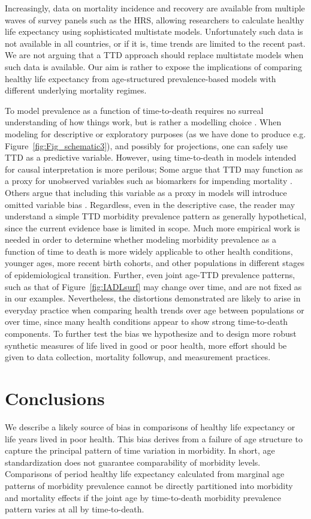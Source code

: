 \documentclass[11pt,oneside,a4paper]{article} %
\begin{document}
Increasingly, data on mortality incidence and recovery are available from
multiple waves of survey panels such as the HRS, allowing researchers to
calculate healthy life expectancy using sophisticated multistate models.
Unfortunately such data is not available in all countries, or if it is, time
trends are limited to the recent past. We are not arguing that a TTD approach
should replace multistate models when such data is available. Our aim is rather
to expose the implications of comparing healthy life expectancy from
age-structured prevalence-based models with different underlying mortality
regimes.

To model prevalence as a function of
time-to-death requires no surreal understanding of how things work, but is
rather a modelling choice \citep{wolf2015disability}. When modeling for
descriptive or exploratory purposes (as we have done to produce e.g. Figure~\ref{fig:Fig_schematic3}),
and possibly for projections, one can safely use
TTD as a predictive variable.
However, using time-to-death in models intended for causal interpretation is more perilous; Some argue that TTD may function as a proxy for unobserved variables such as biomarkers for impending mortality \citep{wolf2015disability}. Others argue that including this variable as a proxy in models will introduce omitted variable bias \citep{lynch2015commentary}. Regardless, even in the descriptive case, the reader may understand a simple TTD morbidity prevalence pattern as generally hypothetical, since the current evidence base is limited in scope. Much more empirical work is needed in order to determine whether modeling morbidity
prevalence as a function of time to death is more widely applicable to
other health conditions, younger ages, more recent birth
cohorts, and other populations in different stages of epidemiological
transition. Further, even joint age-TTD prevalence patterns, such as that of Figure~\ref{fig:IADLsurf} may change over time, and are not fixed as in our examples. Nevertheless, the distortions demonstrated are likely to arise in everyday practice when comparing health trends over age between populations or over time, since many health conditions appear to show strong time-to-death components. To further test the bias we hypothesize and to design more robust synthetic measures of life lived in good or poor health, more effort should be given to data collection, mortality followup, and measurement practices.

\section{Conclusions}
We describe a likely source of bias in comparisons of healthy life expectancy or life years lived in poor health. This bias derives from a failure of age structure to capture the principal pattern of time variation in morbidity. In short, age standardization does not guarantee comparability of morbidity levels. Comparisons of period healthy life expectancy calculated from marginal age patterns of morbidity prevalence cannot be directly partitioned into morbidity and mortality effects if the joint age by time-to-death morbidity prevalence pattern varies at all by time-to-death. 
\end{document}
